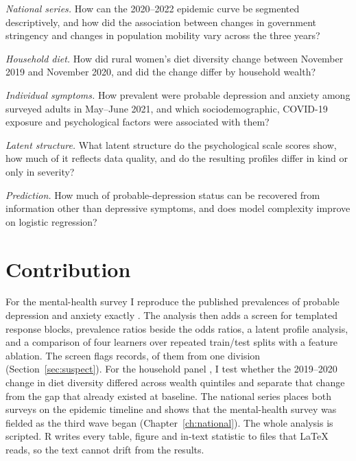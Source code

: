 \begin{description}[leftmargin=1.2cm,style=nextline]
  \item[RQ1] \textit{National series.} How can the 2020--2022 epidemic curve be segmented descriptively, and how did the association between changes in government stringency and changes in population mobility vary across the three years?
  \item[RQ2] \textit{Household diet.} How did rural women's diet diversity change between November 2019 and November 2020, and did the change differ by household wealth?
  \item[RQ3] \textit{Individual symptoms.} How prevalent were probable depression and anxiety among surveyed adults in May--June 2021, and which sociodemographic, COVID-19 exposure and psychological factors were associated with them?
  \item[RQ4] \textit{Latent structure.} What latent structure do the psychological scale scores show, how much of it reflects data quality, and do the resulting profiles differ in kind or only in severity?
  \item[RQ5] \textit{Prediction.} How much of probable-depression status can be recovered from information other than depressive symptoms, and does model complexity improve on logistic regression?
\end{description}

\section{Contribution}
For the mental-health survey I reproduce the published prevalences of probable depression and anxiety exactly \parencite{islam2023,mhdata2022}. The analysis then adds a screen for templated response blocks, prevalence ratios beside the odds ratios, a latent profile analysis, and a comparison of four learners over \RepN{} repeated train/test splits with a feature ablation. The screen flags \SuspectN{} records, \SuspectChatto{} of them from one division (Section~\ref{sec:suspect}). For the household panel \parencite{panel2021}, I test whether the 2019--2020 change in diet diversity differed across wealth quintiles and separate that change from the gap that already existed at baseline. The national series places both surveys on the epidemic timeline and shows that the mental-health survey was fielded as the third wave began (Chapter~\ref{ch:national}). The whole analysis is scripted. R writes every table, figure and in-text statistic to files that \LaTeX{} reads, so the text cannot drift from the results.


